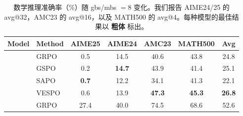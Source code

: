 \documentclass{article}
\theoremstyle{plain}
\theoremstyle{definition}
\theoremstyle{remark}
\begin{document}
\begin{table}[h]
  \caption{数学推理准确率（\%）随 gbs/mbs $= 8$ 变化。我们报告 AIME24/25 的 avg@32，AMC23 的 avg@16，以及 MATH500 的 avg@4。每种模型的最佳结果以 \textbf{粗体} 标出。}
  \label{tab:main-results}
  \centering
  \begin{small}
    \setlength{\tabcolsep}{1.0pt}
    \begin{tabular}{@{}l|l|ccccc@{}}
      \toprule
      Model & Method                        & AIME25                                & AIME24                                & AMC23                                 & MATH500                               & Avg                                   \\
      \midrule
            & GRPO                          & 0.5                                   & {14.5}                                & 40.6                                  & 43.8                                  & 24.8                                  \\
            & GSPO                          & 0.2                                   & \textbf{14.7}                         & 43.9                                  & 41.4                                  & 25.1                                  \\
            & SAPO                          & \textbf{0.7}                          & 12.2                                  & 34.1                                  & 41.3                                  & 22.1                                  \\
            & VESPO & 0.6           & 13.9          & \textbf{47.3} & \textbf{45.3} & \textbf{26.8} \\
      \midrule
            & GRPO                          & 27.4                                  & 40.0                                  & 74.5                                  & 68.6                                  & 52.6                                  \\

\end{tabular}
\end{small}
\end{table}
\end{document}
